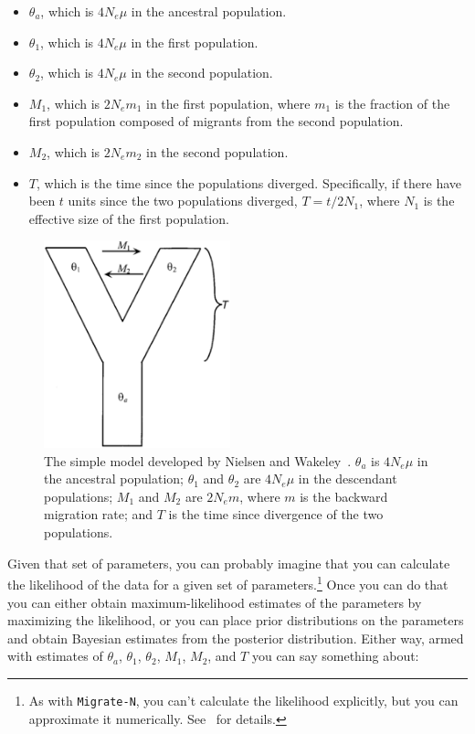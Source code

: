 \begin{itemize}

\item $\theta_a$, which is $4N_e\mu$ in the ancestral population.

\item $\theta_1$, which is $4N_e\mu$ in the first population.

\item $\theta_2$, which is $4N_e\mu$ in the second population.

\item $M_1$, which is $2N_em_1$ in the first population, where $m_1$ is
  the fraction of the first population composed of migrants from the
  second population.

\item $M_2$, which is $2N_em_2$ in the second population.

\item $T$, which is the time since the populations
  diverged. Specifically, if there have been $t$ units since
  the two populations diverged, $T=t/2N_1$, where $N_1$ is the
  effective size of the first population.

\end{itemize}

\begin{figure}
\begin{center}
\includegraphics[height=6cm]{nielsen-wakeley.eps}
\end{center}
\caption{The simple model developed by Nielsen and
  Wakeley~\cite{Nielsen-Wakeley-2001}. $\theta_a$ is $4N_e\mu$ in the
  ancestral population; $\theta_1$ and $\theta_2$ are $4N_e\mu$ in the
  descendant populations; $M_1$ and $M_2$ are $2N_em$, where $m$ is
  the backward migration rate; and $T$ is the time since divergence of
  the two populations.}\label{fig:nielsen-wakeley}
\end{figure}

Given that set of parameters, you can probably imagine that you can
calculate the likelihood of the data for a given set of
parameters.\footnote{As with {\tt Migrate-N}, you can't calculate the
  likelihood explicitly, but you can approximate it
  numerically. See~\cite{Nielsen-Wakeley-2001} for details.} Once you
can do that you can either obtain maximum-likelihood estimates of the
parameters by maximizing the likelihood, or you can place prior
distributions on the parameters and obtain Bayesian estimates from the
posterior distribution. Either way, armed with estimates of
$\theta_a$, $\theta_1$, $\theta_2$, $M_1$, $M_2$, and $T$ you can say
something about:

